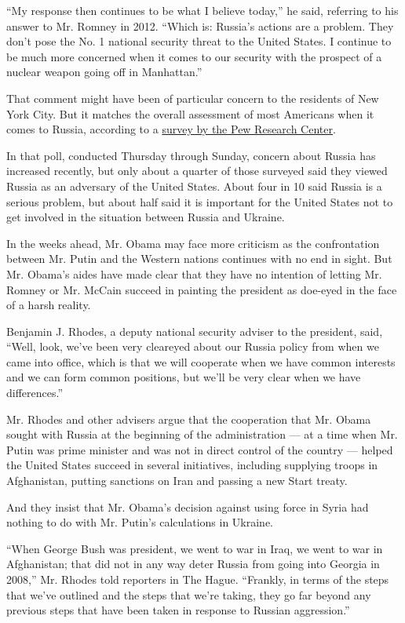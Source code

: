 ``My response then continues to be what I believe today,'' he said,
referring to his answer to Mr. Romney in 2012. ``Which is: Russia's
actions are a problem. They don't pose the No. 1 national security
threat to the United States. I continue to be much more concerned when
it comes to our security with the prospect of a nuclear weapon going off
in Manhattan.''

That comment might have been of particular concern to the residents of
New York City. But it matches the overall assessment of most Americans
when it comes to Russia, according to a
\href{http://www.people-press.org/2014/03/25/concerns-about-russia-rise-but-just-a-quarter-call-moscow-an-adversary/}{survey
by the Pew Research Center}.

In that poll, conducted Thursday through Sunday, concern about Russia
has increased recently, but only about a quarter of those surveyed said
they viewed Russia as an adversary of the United States. About four in
10 said Russia is a serious problem, but about half said it is important
for the United States not to get involved in the situation between
Russia and Ukraine.

In the weeks ahead, Mr. Obama may face more criticism as the
confrontation between Mr. Putin and the Western nations continues with
no end in sight. But Mr. Obama's aides have made clear that they have no
intention of letting Mr. Romney or Mr. McCain succeed in painting the
president as doe-eyed in the face of a harsh reality.

Benjamin J. Rhodes, a deputy national security adviser to the president,
said, ``Well, look, we've been very cleareyed about our Russia policy
from when we came into office, which is that we will cooperate when we
have common interests and we can form common positions, but we'll be
very clear when we have differences.''

Mr. Rhodes and other advisers argue that the cooperation that Mr. Obama
sought with Russia at the beginning of the administration --- at a time
when Mr. Putin was prime minister and was not in direct control of the
country --- helped the United States succeed in several initiatives,
including supplying troops in Afghanistan, putting sanctions on Iran and
passing a new Start treaty.

And they insist that Mr. Obama's decision against using force in Syria
had nothing to do with Mr. Putin's calculations in Ukraine.

``When George Bush was president, we went to war in Iraq, we went to war
in Afghanistan; that did not in any way deter Russia from going into
Georgia in 2008,'' Mr. Rhodes told reporters in The Hague. ``Frankly, in
terms of the steps that we've outlined and the steps that we're taking,
they go far beyond any previous steps that have been taken in response
to Russian aggression.''

